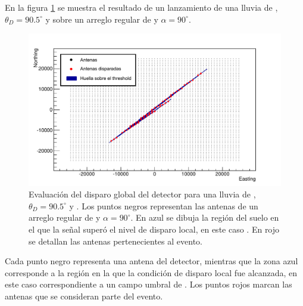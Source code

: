 	En la figura \ref{fig:globalTriggerRadio} se muestra el resultado de un lanzamiento de una lluvia de , $\theta_D=90.5^\circ$ y  sobre un arreglo regular de  y $\alpha=90^\circ$.
	\begin{figure}[h!]
		\begin{center}
			\includegraphics[width=\textwidth]{fig/resultadosRadio/trigger}
			\caption{Evaluaci\'on del disparo global del detector para una lluvia de , $\theta_D=90.5^\circ$ y . Los puntos negros representan las antenas de un arreglo regular de  y $\alpha=90^\circ$. En azul se dibuja la regi\'on del suelo en el que la se\~nal super\'o el nivel de disparo local, en este caso . En rojo se detallan las antenas pertenecientes al evento.}
			\label{fig:globalTriggerRadio}
		\end{center}
	\end{figure}
	Cada punto negro representa una antena del detector, mientras que la zona azul corresponde a la regi\'on en la que la condici\'on de disparo local fue alcanzada, en este caso correspondiente a un campo umbral de .
	Los puntos rojos marcan las antenas que se consideran parte del evento.
	
